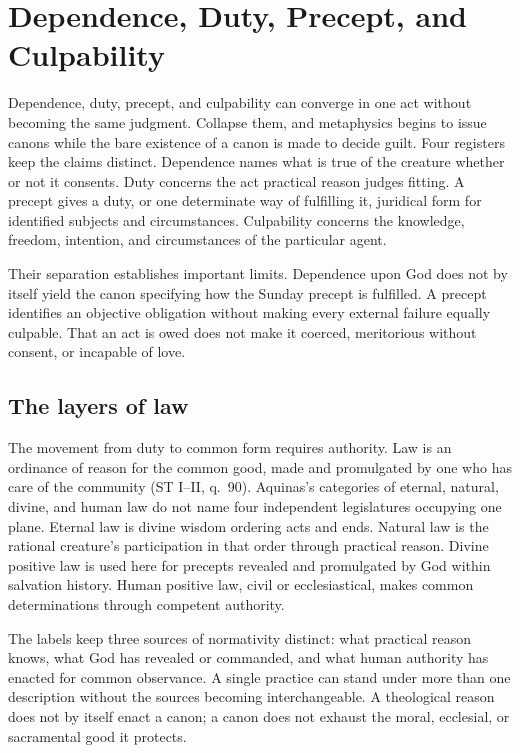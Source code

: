 \section{Dependence, Duty, Precept, and Culpability}

Dependence, duty, precept, and culpability can converge in one act without becoming the same judgment. Collapse them, and metaphysics begins to issue canons while the bare existence of a canon is made to decide guilt. Four registers keep the claims distinct. Dependence names what is true of the creature whether or not it consents. Duty concerns the act practical reason judges fitting. A precept gives a duty, or one determinate way of fulfilling it, juridical form for identified subjects and circumstances. Culpability concerns the knowledge, freedom, intention, and circumstances of the particular agent.

Their separation establishes important limits. Dependence upon God does not by itself yield the canon specifying how the Sunday precept is fulfilled. A precept identifies an objective obligation without making every external failure equally culpable. That an act is owed does not make it coerced, meritorious without consent, or incapable of love.

\subsection{The layers of law}

The movement from duty to common form requires authority. Law is an ordinance of reason for the common good, made and promulgated by one who has care of the community (ST I--II, q.~90). Aquinas's categories of eternal, natural, divine, and human law do not name four independent legislatures occupying one plane. Eternal law is divine wisdom ordering acts and ends. Natural law is the rational creature's participation in that order through practical reason. Divine positive law is used here for precepts revealed and promulgated by God within salvation history. Human positive law, civil or ecclesiastical, makes common determinations through competent authority.

The labels keep three sources of normativity distinct: what practical reason knows, what God has revealed or commanded, and what human authority has enacted for common observance. A single practice can stand under more than one description without the sources becoming interchangeable. A theological reason does not by itself enact a canon; a canon does not exhaust the moral, ecclesial, or sacramental good it protects.

